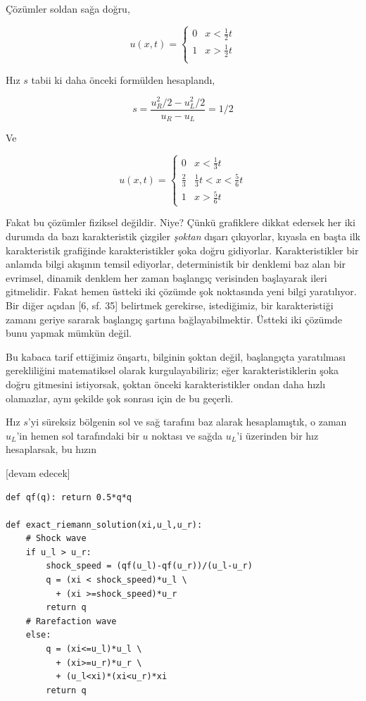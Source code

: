 \documentclass[12pt,fleqn]{article}\usepackage{../../common}
\begin{document}
Çözümler soldan sağa doğru,

$$
u(x,t) =
\left\{ \begin{array}{ll}
0 & x < \frac{1}{2} t  \\
1 & x > \frac{1}{2} t  \\
\end{array} \right.
$$

Hız $s$ tabii ki daha önceki formülden hesaplandı, 

$$
s = \frac{u_R^2 / 2 - u_L^2 / 2 }{u_R - u_L} = 1/2
$$

Ve

$$
u(x,t) =
\left\{ \begin{array}{ll}
0 & x < \frac{1}{3} t  \\
\frac{2}{3} & \frac{1}{3} t < x < \frac{5}{6} t  \\
1 & x > \frac{5}{6} t  
\end{array} \right.
$$

Fakat bu çözümler fiziksel değildir. Niye? Çünkü grafiklere dikkat edersek
her iki durumda da bazı karakteristik çizgiler {\em şoktan} dışarı çıkıyorlar,
kıyasla en başta ilk karakteristik grafiğinde karakteristikler şoka doğru
gidiyorlar. Karakteristikler bir anlamda bilgi akışının temsil ediyorlar,
deterministik bir denklemi baz alan bir evrimsel, dinamik denklem her zaman
başlangıç verisinden başlayarak ileri gitmelidir. Fakat hemen üstteki iki
çözümde şok noktasında yeni bilgi yaratılıyor. Bir diğer açıdan [6, sf. 35]
belirtmek gerekirse, istediğimiz, bir karakteristiği zamanı geriye sararak
başlangıç şartına bağlayabilmektir. Üstteki iki çözümde bunu yapmak mümkün değil. 

Bu kabaca tarif ettiğimiz önşartı, bilginin şoktan değil, başlangıçta
yaratılması gerekliliğini matematiksel olarak kurgulayabiliriz; eğer
karakteristiklerin şoka doğru gitmesini istiyorsak, şoktan önceki
karakteristikler ondan daha hızlı olamazlar, aynı şekilde şok sonrası için de bu
geçerli.

Hız $s$'yi süreksiz bölgenin sol ve sağ tarafını baz alarak hesaplamıştık, o
zaman $u_L$'in hemen sol tarafındaki bir $u$ noktası ve sağda $u_L$'i üzerinden
bir hız hesaplarsak, bu hızın 


[devam edecek]

\begin{verbatim}
def qf(q): return 0.5*q*q
    
def exact_riemann_solution(xi,u_l,u_r):
    # Shock wave
    if u_l > u_r: 
        shock_speed = (qf(u_l)-qf(u_r))/(u_l-u_r)
        q = (xi < shock_speed)*u_l \
          + (xi >=shock_speed)*u_r
        return q
    # Rarefaction wave
    else:  
        q = (xi<=u_l)*u_l \
          + (xi>=u_r)*u_r \
          + (u_l<xi)*(xi<u_r)*xi
        return q
\end{verbatim}
\end{document}
